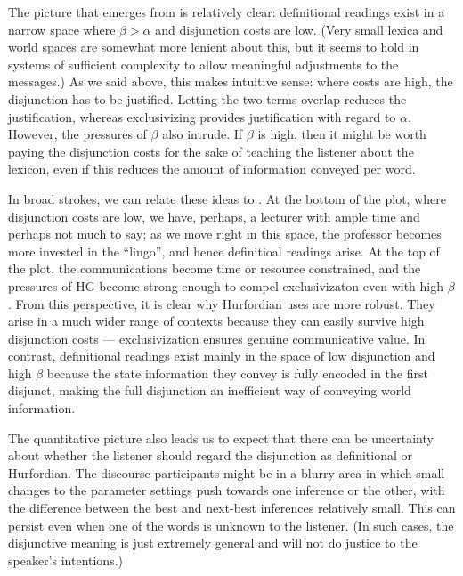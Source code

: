 \documentclass[12pt,twoside]{article}
\renewcommand{\_}{\textbf{\textunderscore\hspace{-4pt}\textunderscore\hspace{-3pt}\textunderscore\hspace{-4pt}\textunderscore}\hspace{0.5pt}}			%
\begin{document}
The picture that emerges from  is relatively clear:
definitional readings exist in a narrow space where $\beta > \alpha$
and disjunction costs are low. (Very small lexica and world spaces are
somewhat more lenient about this, but it seems to hold in systems of
sufficient complexity to allow meaningful adjustments to the
messages.) As we said above, this makes intuitive sense: where costs
are high, the disjunction has to be justified. Letting the two terms
overlap reduces the justification, whereas exclusivizing provides
justification with regard to $\alpha$. However, the pressures of
$\beta$ also intrude. If $\beta$ is high, then it might be worth
paying the disjunction costs for the sake of teaching the listener
about the lexicon, even if this reduces the amount of information
conveyed per word. 

In broad strokes, we can relate these ideas to . At
the bottom of the plot, where disjunction costs are low, we have,
perhaps, a lecturer with ample time and perhaps not much to say; as we
move right in this space, the professor becomes more invested in the
``lingo'', and hence definitioal readings arise.  At the top of the
plot, the communications become time or resource constrained, and the
pressures of HG become strong enough to compel exclusivizaton even
with high $\beta$. From this perspective, it is clear why Hurfordian
uses are more robust. They arise in a much wider range of contexts
because they can easily survive high disjunction costs ---
exclusivization ensures genuine communicative value. In contrast,
definitional readings exist mainly in the space of low disjunction and
high $\beta$ because the state information they convey is fully
encoded in the first disjunct, making the full disjunction an
inefficient way of conveying world information.

The quantitative picture also leads us to expect that there can be
uncertainty about whether the listener should regard the disjunction
as definitional or Hurfordian. The discourse participants might be in
a blurry area in which small changes to the parameter settings push
towards one inference or the other, with the difference between the
best and next-best inferences relatively small. This can persist even
when one of the words is unknown to the listener. (In such cases, the
disjunctive meaning is just extremely general and will not do justice
to the speaker's intentions.)
\end{document}
